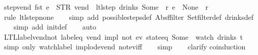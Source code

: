 \begin{isabellebody}
\endisatagproof
{\isafoldproof}%
%
\isadelimproof
\isanewline
%
\endisadelimproof
\isanewline
{}\isamarkupfalse%
\ step{\isacharunderscore}{}{\isacharunderscore}vend{\isacharcolon}\ {\isachardoublequoteopen}fst\ e\ {\isacharequal}\ STR\ {\isacharprime}{\isacharprime}vend{\isacharprime}{\isacharprime}\ {\isasymLongrightarrow}\ ltl{\isacharunderscore}step\ drinks\ {\isacharparenleft}Some\ {}{\isacharparenright}\ r\ e\ {\isacharequal}\ {\isacharparenleft}None{\isacharcomma}\ {\isacharbrackleft}{\isacharbrackright}{\isacharcomma}\ r{\isacharparenright}{\isachardoublequoteclose}\isanewline
%
\isadelimproof
\ \ %
\endisadelimproof
%
\isatagproof
{}\isamarkupfalse%
\ {\isacharparenleft}rule\ ltl{\isacharunderscore}step{\isacharunderscore}none{\isacharunderscore}{}{\isacharparenright}\isanewline
\ \ \isamarkupfalse%
\ {\isacharparenleft}simp\ add{\isacharcolon}\ possible{\isacharunderscore}steps{\isacharunderscore}def\ Abs{\isacharunderscore}ffilter\ Set{\isachardot}filter{\isacharunderscore}def\ drinks{\isacharunderscore}def{\isacharparenright}\isanewline
\ \ \isamarkupfalse%
\ {\isacharparenleft}simp\ add{\isacharcolon}\ init{\isacharunderscore}def{\isacharparenright}\isanewline
\ \ \isamarkupfalse%
\ auto%
\endisatagproof
{\isafoldproof}%
%
\isadelimproof
\isanewline
%
\endisadelimproof
\isanewline
{}\isamarkupfalse%
\ LTL{\isacharunderscore}label{\isacharunderscore}vend{\isacharunderscore}not{\isacharunderscore}{}{\isacharcolon}\ {\isachardoublequoteopen}{\isacharparenleft}{\isacharparenleft}label{\isacharunderscore}eq\ {\isacharprime}{\isacharprime}vend{\isacharprime}{\isacharprime}{\isacharparenright}\ impl\ {\isacharparenleft}not\ {\isacharparenleft}ev\ {\isacharparenleft}state{\isacharunderscore}eq\ {\isacharparenleft}Some\ {}{\isacharparenright}{\isacharparenright}{\isacharparenright}{\isacharparenright}{\isacharparenright}\ {\isacharparenleft}watch\ drinks\ t{\isacharparenright}{\isachardoublequoteclose}\isanewline
%
\isadelimproof
\ \ %
\endisadelimproof
%
\isatagproof
{}\isamarkupfalse%
\ {\isacharparenleft}simp\ only{\isacharcolon}\ watch{\isacharunderscore}label\ implode{\isacharunderscore}vend\ not{\isacharunderscore}ev{\isacharunderscore}iff{\isacharparenright}\isanewline
\ \ \isamarkupfalse%
\ simp\isanewline
\ \ \isamarkupfalse%
\ clarify\isanewline
{}\isamarkupfalse%
{\isacharparenleft}coinduction{\isacharparenright}\isanewline

\end{isabellebody}
